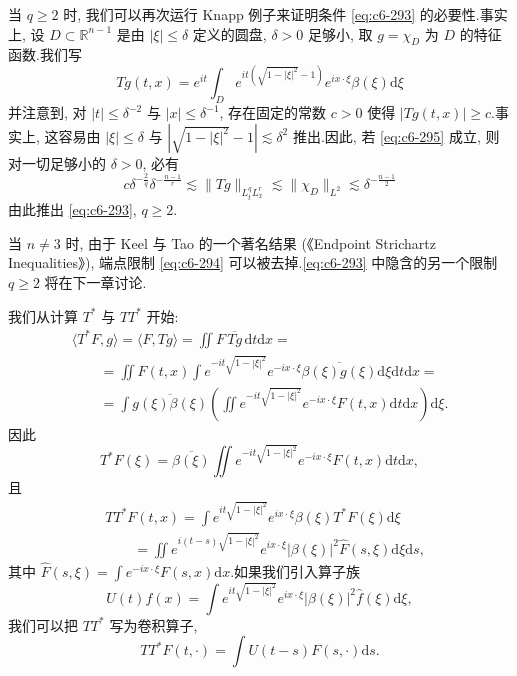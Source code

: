 \begin{remark}\label{rem:c6-8.18}
当 $q \geq 2$ 时, 我们可以再次运行 Knapp 例子来证明条件 \eqref{eq:c6-293} 的必要性.事实上, 设 $D \subset \mathbb{R}^{n-1}$ 是由 $|\xi| \leq \delta$ 定义的圆盘, $\delta > 0$ 足够小, 取 $g = \chi_D$ 为 $D$ 的特征函数.我们写
\[
Tg(t, x) = e^{it} \int_D e^{it(\sqrt{1 - |\xi|^2} - 1)} e^{ix \cdot \xi} \beta(\xi) \mathrm{d}\xi
\]
并注意到, 对 $|t| \leq \delta^{-2}$ 与 $|x| \leq \delta^{-1}$, 存在固定的常数 $c > 0$ 使得 $|Tg(t, x)| \geq c$.事实上, 这容易由 $|\xi| \le \delta$ 与 $|\sqrt{1 - |\xi|^2} - 1| \lesssim \delta^2$ 推出.因此, 若 \eqref{eq:c6-295} 成立, 则对一切足够小的 $\delta > 0$, 必有
\[
c \delta^{-\frac{2}{q}} \delta^{-\frac{n-1}{r}} \lesssim \|Tg\|_{L^q_t L^r_x} \lesssim \|\chi_D\|_{L^2} \lesssim \delta^{-\frac{n-1}{2}}
\]
由此推出 \eqref{eq:c6-293}, $q \geq 2$.
\end{remark}

\begin{remark}\label{rem:c6-8.19}
当 $n \neq 3$ 时, 由于 Keel 与 Tao 的一个著名结果 \cite{k-t}(《Endpoint Strichartz Inequalities》), 端点限制 \eqref{eq:c6-294} 可以被去掉.\eqref{eq:c6-293} 中隐含的另一个限制 $q \geq 2$ 将在下一章讨论.
\end{remark}

我们从计算 $T^*$ 与 $TT^*$ 开始:
\[
\begin{array}{l}
\langle T^* F, g \rangle = \langle F, Tg \rangle = \iint F\, \overline{Tg}\, \mathrm{d}t \mathrm{d}x = \\
\qquad = \iint F(t, x) \int e^{-it\sqrt{1 - |\xi|^2}} e^{-ix \cdot \xi} \overline{\beta(\xi) g(\xi)} \mathrm{d}\xi \mathrm{d}t \mathrm{d}x = \\
\qquad = \int \overline{g(\xi) \beta(\xi)} \left(\iint e^{-it\sqrt{1 - |\xi|^2}} e^{-ix \cdot \xi} F(t, x) \mathrm{d}t \mathrm{d}x\right) \mathrm{d}\xi.
\end{array}
\]
因此
\[
T^* F(\xi) = \overline{\beta(\xi)} \iint e^{-it\sqrt{1 - |\xi|^2}} e^{-ix \cdot \xi} F(t, x) \mathrm{d}t \mathrm{d}x,
\]
且
\[
\begin{array}{rl}
& TT^* F(t, x) = \int e^{it\sqrt{1 - |\xi|^2}} e^{ix \cdot \xi} \beta(\xi) T^* F(\xi) \mathrm{d}\xi \\
& \qquad = \iint e^{i(t-s)\sqrt{1 - |\xi|^2}} e^{ix \cdot \xi} |\beta(\xi)|^2 \hat{F}(s, \xi) \mathrm{d}\xi \mathrm{d}s,
\end{array}
\]
其中 $\hat{F}(s, \xi) = \int e^{-ix \cdot \xi} F(s, x) \mathrm{d}x$.如果我们引入算子族
\[
U(t) f(x) = \int e^{it\sqrt{1 - |\xi|^2}} e^{ix \cdot \xi} |\beta(\xi)|^2 \hat{f}(\xi) \mathrm{d}\xi,
\]
我们可以把 $TT^*$ 写为卷积算子,
\begin{equation}
TT^* F(t, \cdot) = \int U(t-s) F(s, \cdot) \mathrm{d}s.\label{eq:c6-296}
\end{equation}


